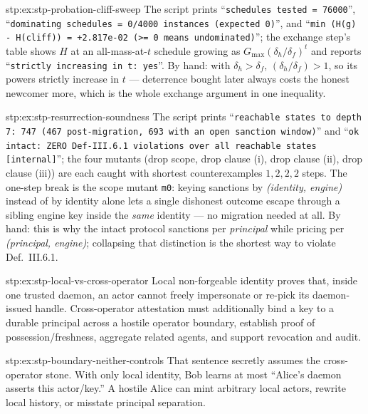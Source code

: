 \begin{pdSolution}{stp:ex:stp-probation-cliff-sweep}
The script prints ``\texttt{schedules tested = 76000}'', ``\texttt{dominating
schedules = 0/4000 instances (expected 0)}'', and
``\texttt{min (H(g) - H(cliff)) = +2.817e-02 (>= 0 means undominated)}''; the
exchange step's table shows $H$ at an all-mass-at-$t$ schedule growing as
$G_{\max}(\delta_h/\delta_f)^t$ and reports ``\texttt{strictly increasing in
t: yes}''. By hand: with $\delta_h>\delta_f$, $(\delta_h/\delta_f)>1$, so its
powers strictly increase in $t$ --- deterrence bought later always costs the
honest newcomer more, which is the whole exchange argument in one inequality.
\end{pdSolution}
\begin{pdSolution}{stp:ex:stp-resurrection-soundness}
The script prints ``\texttt{reachable states to depth 7: 747 (467
post-migration, 693 with an open sanction window)}'' and ``\texttt{ok
intact: ZERO Def-III.6.1 violations over all reachable states [internal]}'';
the four mutants (drop scope, drop clause (i), drop clause (ii), drop clause
(iii)) are each caught with shortest counterexamples $1, 2, 2, 2$ steps. The
one-step break is the scope mutant \texttt{m0}: keying sanctions by
\emph{(identity, engine)} instead of by identity alone lets a single dishonest
outcome escape through a sibling engine key inside the \emph{same} identity
--- no migration needed at all. By hand: this is why the intact protocol
sanctions per \emph{principal} while pricing per \emph{(principal, engine)};
collapsing that distinction is the shortest way to violate Def.~III.6.1.
\end{pdSolution}
\begin{pdSolution}{stp:ex:stp-local-vs-cross-operator}
Local non-forgeable identity proves that, inside one trusted daemon, an actor
cannot freely impersonate or re-pick its daemon-issued handle. Cross-operator
attestation must additionally bind a key to a durable principal across a
hostile operator boundary, establish proof of possession/freshness, aggregate
related agents, and support revocation and audit.
\end{pdSolution}
\begin{pdSolution}{stp:ex:stp-boundary-neither-controls}
That sentence secretly assumes the cross-operator stone. With only local
identity, Bob learns at most ``Alice's daemon asserts this actor/key.'' A
hostile Alice can mint arbitrary local actors, rewrite local history, or
misstate principal separation.
\end{pdSolution}
